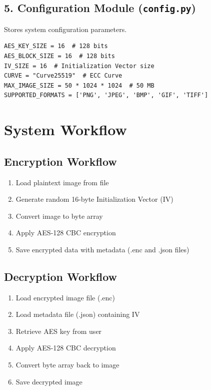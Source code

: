 \documentclass[12pt,a4paper]{report}
\begin{document}
\subsection{5. Configuration Module (\texttt{config.py})}

Stores system configuration parameters.

\begin{lstlisting}[caption=Configuration Parameters]
AES_KEY_SIZE = 16  # 128 bits
AES_BLOCK_SIZE = 16  # 128 bits
IV_SIZE = 16  # Initialization Vector size
CURVE = "Curve25519"  # ECC Curve
MAX_IMAGE_SIZE = 50 * 1024 * 1024  # 50 MB
SUPPORTED_FORMATS = ['PNG', 'JPEG', 'BMP', 'GIF', 'TIFF']
\end{lstlisting}

\section{System Workflow}

\subsection{Encryption Workflow}

\begin{enumerate}
    \item Load plaintext image from file
    \item Generate random 16-byte Initialization Vector (IV)
    \item Convert image to byte array
    \item Apply AES-128 CBC encryption
    \item Save encrypted data with metadata (.enc and .json files)
\end{enumerate}

\subsection{Decryption Workflow}

\begin{enumerate}
    \item Load encrypted image file (.enc)
    \item Load metadata file (.json) containing IV
    \item Retrieve AES key from user
    \item Apply AES-128 CBC decryption
    \item Convert byte array back to image
    \item Save decrypted image
\end{enumerate}
\end{document}

